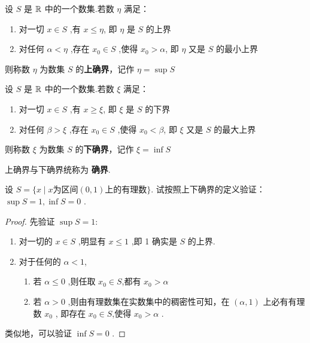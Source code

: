 \begin{definition}[上确界]\label{def:sup}
    \renewcommand{\theenumi}{\roman{enumi}}
    \renewcommand{\labelenumi}{\normalfont (\theenumi)}
    设 $S$ 是 $\mathbb{R}$ 中的一个数集.若数 $\eta$ 满足：
    \begin{enumerate}
        \item 对一切 $x\in S$ ,有 $x\le \eta$, 即 $\eta$ 是 $S$ 的上界
        \item 对任何 $\alpha<\eta$ ,存在 $x_0\in S$ ,使得 $x_0> \alpha$, 即 $\eta$ 又是 $S$ 的最小上界
    \end{enumerate}
    则称数 $\eta$ 为数集 $S$ 的\textbf{上确界}，记作 $\eta=\sup S$
\end{definition}

\begin{definition}[下确界]\label{def:inf}
    \renewcommand{\theenumi}{\roman{enumi}}
    \renewcommand{\labelenumi}{\normalfont (\theenumi)}
    设 $S$ 是 $\mathbb{R}$ 中的一个数集.若数 $\xi$ 满足：
    \begin{enumerate}
        \item 对一切 $x\in S$ ,有 $x\ge \xi$, 即 $\xi$ 是 $S$ 的下界
        \item 对任何 $\beta>\xi$ ,存在 $x_0\in S$ ,使得 $x_0< \beta$, 即 $\xi$ 又是 $S$ 的最大上界
    \end{enumerate}
    则称数 $\xi$ 为数集 $S$ 的\textbf{下确界}，记作 $\xi=\inf S$
\end{definition}

上确界与下确界统称为 \textbf{确界}.

\begin{example}
    设 $S=\{ x \mid x \mbox{为区间} (0,1) \mbox{上的有理数} \}$. 试按照上下确界的定义验证： $\sup S =1,\inf S=0$ .
\end{example}

\begin{proof}
    \renewcommand{\theenumi}{\roman{enumi}}
    \renewcommand{\labelenumi}{\normalfont (\theenumi)}
    先验证 $\sup S=1$:
    \begin{enumerate}
        \item 对一切的 $x\in S$ ,明显有 $x\le 1$ ,即 1 确实是 $S$ 的上界.
        \item 对于任何的 $\alpha <1$, 
        \begin{enumerate}
            \item[\textbullet] 若 $\alpha \le 0$ ,则任取 $x_0 \in S$,都有 $x_0>\alpha$
            \item[\textbullet] 若 $\alpha>0$ ,则由有理数集在实数集中的稠密性可知，在 $(\alpha,1)$ 上必有有理数 $x_0$ , 即存在 $x_0 \in S$,使得 $x_0>\alpha$ .
        \end{enumerate}
    \end{enumerate}

    类似地，可以验证 $\inf S=0$ .
\end{proof}

